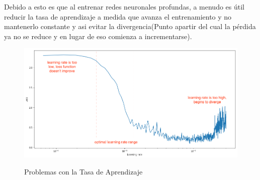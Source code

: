 		Debido a esto es que al entrenar redes neuronales profundas, a menudo es útil reducir la tasa de aprendizaje a medida que avanza el entrenamiento y no mantenerlo constante y asi evitar la divergencia(Punto apartir del cual la pérdida ya no se reduce y en lugar de eso comienza a incrementarse).


		\begin{figure}[H]
		\includegraphics[width=1\textwidth]{images/desarrollo/entrenamiento/lr_finder}
		\begin{center}
		\caption{\small{Problemas con la Tasa de Aprendizaje}}
		{\small{\cite{AdamImg}}}
		\end{center}
		\vspace{-1.5em}
		\end{figure}


